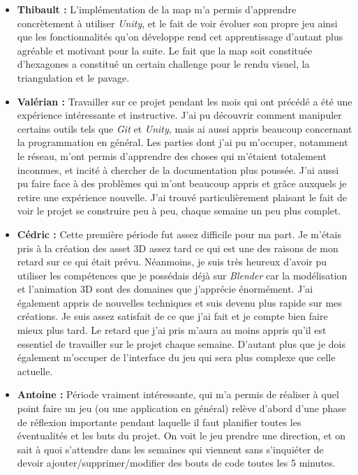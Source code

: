 \documentclass[12pt]{report}
\begin{document}
\begin{itemize}
	\item \textbf{Thibault :} L’implémentation de la map m’a permis d’apprendre concrètement à utiliser \textit{Unity}, et le fait de voir évoluer son propre jeu ainsi que les fonctionnalités qu’on développe rend cet apprentissage d’autant plus agréable et motivant pour la suite. Le fait que la map soit constituée d’hexagones a constitué un certain challenge pour le rendu visuel, la triangulation et le pavage.
    \item \textbf{Valérian :} Travailler sur ce projet pendant les mois qui ont précédé a été une expérience intéressante et instructive. J’ai pu découvrir comment manipuler certains outils tels que \textit{Git} et \textit{Unity}, mais ai aussi appris beaucoup concernant la programmation en général. Les parties dont j’ai pu m’occuper, notamment le réseau, m’ont permis d’apprendre des choses qui m'étaient totalement inconnues, et incité à chercher de la documentation plus poussée. J’ai aussi pu faire face à des problèmes qui m’ont beaucoup appris et grâce auxquels je retire une expérience nouvelle. J’ai trouvé particulièrement plaisant le fait de voir le projet se construire peu à peu, chaque semaine un peu plus complet.
	\item \textbf{Cédric :} Cette première période fut assez difficile pour ma part. Je m’étais pris à la création des asset 3D assez tard ce qui est une des raisons de mon retard sur ce qui était prévu. Néanmoins, je suis très heureux d’avoir pu utiliser les compétences que je possédais déjà sur \textit{Blender} car la modélisation et l’animation 3D sont des domaines que j’apprécie énormément. J’ai également appris de nouvelles techniques et suis devenu plus rapide sur mes créations. Je suis assez satisfait de ce que j’ai fait et je compte bien faire mieux plus tard. Le retard que j’ai pris m’aura au moins appris qu’il est essentiel de travailler sur le projet chaque semaine. D’autant plus que je dois également m’occuper de l’interface du jeu qui sera plus complexe que celle actuelle.
	\item \textbf{Antoine :} Période vraiment intéressante, qui m’a permis de réaliser à quel point faire un jeu (ou une application en général) relève d’abord d’une phase de réflexion importante pendant laquelle il faut planifier toutes les éventualités et les buts du projet. On voit le jeu prendre une direction, et on sait à quoi s’attendre dans les semaines qui viennent sans s’inquiéter de devoir ajouter/supprimer/modifier des bouts de code toutes les 5 minutes.
\end{itemize}
\end{document}
